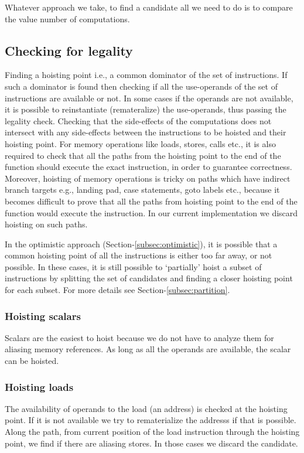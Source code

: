 \documentclass{sig-alternate}
\begin{document}
Whatever approach we take, to find a candidate all we need to do is to compare
the value number of computations.

\subsection{Checking for legality}
Finding a hoisting point i.e., a common dominator of the set of instructions. If
such a dominator is found then checking if all the use-operands of the set of
instructions are available or not. In some cases if the operands are not
available, it is possible to reinstantiate (remateralize) the use-operands, thus
passing the legality check. Checking that the side-effects of the computations
does not intersect with any side-effects between the instructions to be hoisted
and their hoisting point. For memory operations like loads, stores, calls etc.,
it is also required to check that all the paths from the hoisting point to the
end of the function should execute the exact instruction, in order to guarantee
correctness. Moreover, hoisting of memory operations is tricky on paths which
have indirect branch targets e.g., landing pad, case statements, goto labels
etc., because it becomes difficult to prove that all the paths from hoisting
point to the end of the function would execute the instruction. In our current
implementation we discard hoisting on such paths.


In the optimistic approach (Section-\ref{subsec:optimistic}), it is possible
that a common hoisting point of all the instructions is either too far away, or
not possible. In these cases, it is still possible to `partially' hoist a subset
of instructions by splitting the set of candidates and finding a closer hoisting
point for each subset. For more details see Section-\ref{subsec:partition}.

\subsubsection{Hoisting scalars}
Scalars are the easiest to hoist because we do not have to analyze them for
aliasing memory references. As long as all the operands are available, the
scalar can be hoisted.

\subsubsection{Hoisting loads}
The availability of operands to the load (an address) is checked at the hoisting
point. If it is not available we try to rematerialize the addresss if that is
possible.  Along the path, from current position of the load instruction through
the hoisting point, we find if there are aliasing stores. In those cases we
discard the candidate.
\end{document}
